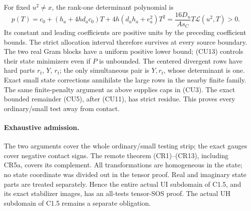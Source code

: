 For fixed $u^2\ne x$, the rank-one determinant polynomial is
\[
 p(T)=c_0+(h_a+4hd_ac_0)T+4h(d_ah_a+e_a^2)T^2
      =\frac{16D_u}{As_C}T\mathcal L(u^2,T)>0.
\]
Its constant and leading coefficients are positive units by the
preceding coefficient bounds. The strict allocation interval
therefore survives at every source boundary. The two real Gram
blocks have a uniform positive lower bound; (CU13) controls their
state minimizers even if $P$ is unbounded. The centered divergent
rows have hard parts $r_t$, $Y$, $r_t$; the only simultaneous pair
is $Y,r_t$, whose determinant is one. Exact small state corrections
annihilate the large rows in the nearby finite family. The same
finite-penalty argument as above supplies caps in (CU3). The exact
bounded remainder (CU5), after (CU11), has strict residue.
This proves every ordinary/small test away from contact.

\paragraph{Exhaustive admission.}
The two arguments cover the whole ordinary/small testing strip;
the exact gauges cover negative contact signs. The remote theorem
(CR1)--(CR13), including CR5a, covers its complement.
All transformations are homogeneous in the state; no state coordinate
was divided out in the tensor proof. Real and imaginary state parts
are treated separately. Hence the entire actual UI subdomain of C1.5,
and its exact stabilizer images, has an all-tests tensor-SOS proof.
The actual UH subdomain of C1.5 remains a separate obligation.

